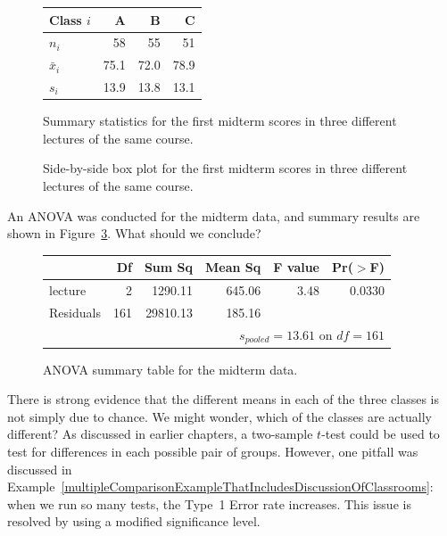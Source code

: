 \begin{figure}
\centering
\begin{tabular}{lrrr}
  \hline
Class $i$	& A	& B	& C \\ 
  \hline
$n_i$		& 58	& 55	& 51 \\ 
$\bar{x}_i$	& 75.1	& 72.0	& 78.9 \\ 
$s_i$		& 13.9	& 13.8	& 13.1 \\ 
\hline
\end{tabular}
\caption{Summary statistics for the first midterm scores in three different lectures of the same course.}
\label{summaryStatisticsForClassTestData}
\end{figure}

\begin{figure}
  \centering
  \caption{Side-by-side box plot for the first midterm
      scores in three different  lectures of the same course.}
  \label{classDataSBSBoxPlot}
\end{figure}

\begin{exercisewrap}
\begin{nexercise} \label{exerExaminingAnovaSummaryTableForMidtermData}
An ANOVA was conducted for the midterm data, and summary results are shown in Figure~\ref{anovaSummaryTableForMidtermData}. What should we conclude?\footnotemark{}
\end{nexercise}
\end{exercisewrap}

\begin{figure}
\centering
\begin{tabular}{lrrrrr}
  \hline
 & Df & Sum Sq & Mean Sq & F value & Pr($>$F) \\ 
  \hline
lecture & 2 & 1290.11 & 645.06 & 3.48 & 0.0330 \\ 
  Residuals & 161 & 29810.13 & 185.16 &  &  \\ 
   \hline
\multicolumn{6}{r}{$s_{pooled}=13.61$ on $df=161$}
\end{tabular}
\caption{ANOVA summary table for the midterm data.}
\label{anovaSummaryTableForMidtermData}
\end{figure}

There is strong evidence that the different means in each of the three classes is not simply due to chance. We might wonder, which of the classes are actually different? As discussed in earlier chapters, a two-sample $t$-test could be used to test for differences in each possible pair of groups. However, one pitfall was discussed in Example~\vref{multipleComparisonExampleThatIncludesDiscussionOfClassrooms}: when we run so many tests, the Type~1 Error rate increases. This issue is resolved by using a modified significance level.

